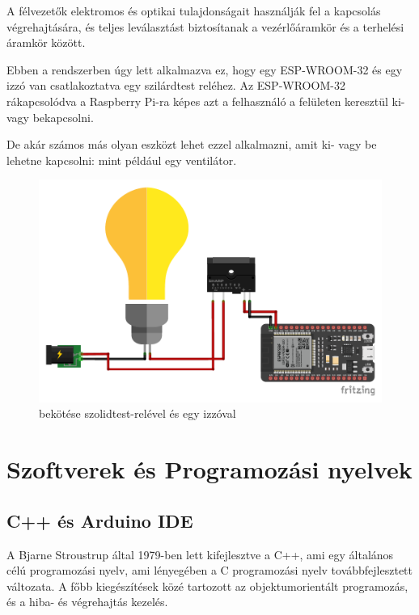 \documentclass[
]{thesis-ekf}
\theoremstyle{definition}
\theoremstyle{remark}
\begin{document}
	A félvezetők elektromos és optikai tulajdonságait használják fel a kapcsolás végrehajtására, és teljes leválasztást biztosítanak a vezérlőáramkör és a terhelési áramkör között.\cite{solid-state-relay}
	
	Ebben a rendszerben úgy lett alkalmazva ez, hogy egy ESP-WROOM-32 és egy izzó van csatlakoztatva egy szilárdtest reléhez. Az ESP-WROOM-32 rákapcsolódva a Raspberry Pi-ra képes azt a felhasználó a felületen keresztül ki- vagy bekapcsolni.
	
	De akár számos más olyan eszközt lehet ezzel alkalmazni, amit ki- vagy be lehetne kapcsolni: mint például egy ventilátor.
	
	\begin{figure}[ht!]
		\centering
		\includegraphics[width=1\textwidth]{./src/schematics/ESP32 toggle schematics_bb}
		\caption{ bekötése szolidtest-relével és egy izzóval}
		\label{toggle-schematics}
	\end{figure}	
	
	\section{Szoftverek és Programozási nyelvek}
	\subsection{C++ és Arduino IDE}
	A Bjarne Stroustrup által 1979-ben lett kifejlesztve a C++, ami egy általános célú programozási nyelv, ami lényegében a C programozási nyelv továbbfejlesztett változata. A főbb kiegészítések közé tartozott az objektumorientált programozás, és a hiba- és végrehajtás kezelés.\cite{cpp}
	
\end{document}
